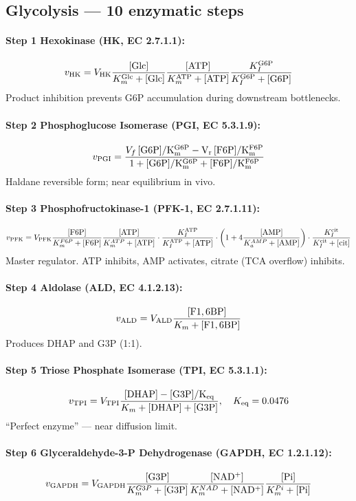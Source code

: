 \documentclass[11pt,a4paper]{article}
\newcommand{\eq}[1]{\begin{equation}#1\end{equation}}
\begin{document}
\subsection{Glycolysis --- 10 enzymatic steps}

\paragraph{Step 1 Hexokinase (HK, EC 2.7.1.1):}
\eq{ v_{\rm HK} = V_{\rm HK}\frac{[\rm Glc]}{K_m^{\rm Glc}+[\rm Glc]}\frac{[\rm ATP]}{K_m^{\rm ATP}+[\rm ATP]}\frac{K_I^{\rm G6P}}{K_I^{\rm G6P}+[\rm G6P]} }
Product inhibition prevents G6P accumulation during downstream bottlenecks.

\paragraph{Step 2 Phosphoglucose Isomerase (PGI, EC 5.3.1.9):}
\eq{ v_{\rm PGI} = \frac{V_f\,[\rm G6P]/K_m^{G6P} - V_r\,[\rm F6P]/K_m^{F6P}}{1+[\rm G6P]/K_m^{G6P}+[\rm F6P]/K_m^{F6P}} }
Haldane reversible form; near equilibrium in vivo.

\paragraph{Step 3 Phosphofructokinase-1 (PFK-1, EC 2.7.1.11):}
\eq{ v_{\rm PFK} = V_{\rm PFK}\frac{[\rm F6P]}{K_m^{F6P}+[\rm F6P]}\frac{[\rm ATP]}{K_m^{ATP}+[\rm ATP]}\cdot\frac{K_I^{\rm ATP}}{K_I^{\rm ATP}+[\rm ATP]}\cdot\bigg(1+4\frac{[\rm AMP]}{K_a^{AMP}+[\rm AMP]}\bigg)\cdot\frac{K_I^{\rm cit}}{K_I^{\rm cit}+[\rm cit]} }
Master regulator. ATP inhibits, AMP activates, citrate (TCA overflow) inhibits.

\paragraph{Step 4 Aldolase (ALD, EC 4.1.2.13):}
\eq{ v_{\rm ALD} = V_{\rm ALD}\frac{[\rm F1,6BP]}{K_m+[\rm F1,6BP]} }
Produces DHAP and G3P (1:1).

\paragraph{Step 5 Triose Phosphate Isomerase (TPI, EC 5.3.1.1):}
\eq{ v_{\rm TPI} = V_{\rm TPI}\frac{[\rm DHAP]-[\rm G3P]/K_{\rm eq}}{K_m+[\rm DHAP]+[\rm G3P]},\quad K_{\rm eq}=0.0476 }
``Perfect enzyme'' --- near diffusion limit.

\paragraph{Step 6 Glyceraldehyde-3-P Dehydrogenase (GAPDH, EC 1.2.1.12):}
\eq{ v_{\rm GAPDH} = V_{\rm GAPDH}\frac{[\rm G3P]}{K_m^{G3P}+[\rm G3P]}\frac{[\rm NAD^+]}{K_m^{NAD}+[\rm NAD^+]}\frac{[\rm Pi]}{K_m^{Pi}+[\rm Pi]} }
\end{document}
